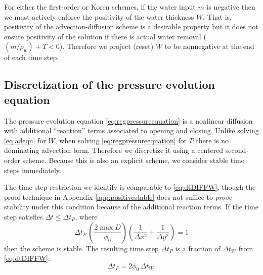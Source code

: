 \documentclass[11pt,final]{amsart}
\begin{document}
For either the first-order or Koren schemes, if the water input $m$ is negative then we must actively enforce the positivity of the water thickness $W$.  That is, positivity of the advection-diffusion scheme is a desirable property but it does not ensure positivity of the solution if there is actual water removal ($(m/\rho_w) + T < 0$).  Therefore we project (reset) $W$ to be nonnegative at the end of each time step.

\subsection*{Discretization of the pressure evolution equation}  The pressure evolution equation \eqref{eq:regpressureequation} is a nonlinear diffusion with additional ``reaction'' terms associated to opening and closing.  Unlike solving \eqref{eq:adeqn} for $W$, when solving \eqref{eq:regpressureequation} for $P$ there is no dominating advection term.  Therefore we discretize it using a centered second-order scheme.  Because this is also an explicit scheme, we consider stable time steps immediately.

The time step restriction we identify is comparable to \eqref{eq:dtDIFFW}, though the proof technique in Appendix \ref{app:positivestable} does not suffice to \emph{prove} stability under this condition because of the additional reaction terms.  If the time step satisfies $\Delta t \le \Delta t_P$, where
\begin{equation}
\Delta t_P\, \left(\frac{2 \max D}{\phi_0}\right) \left(\frac{1}{\Delta x^2} + \frac{1}{\Delta y^2}\right) = 1 \label{eq:dtDIFFP}
\end{equation}
then the scheme is stable.  The resulting time step $\Delta t_P$ is a fraction of $\Delta t_W$ from \eqref{eq:dtDIFFW}:
\begin{equation}
\Delta t_P = 2 \phi_0\, \Delta t_W.  \label{eq:dtDIFFPfromW}
\end{equation}
\end{document}
